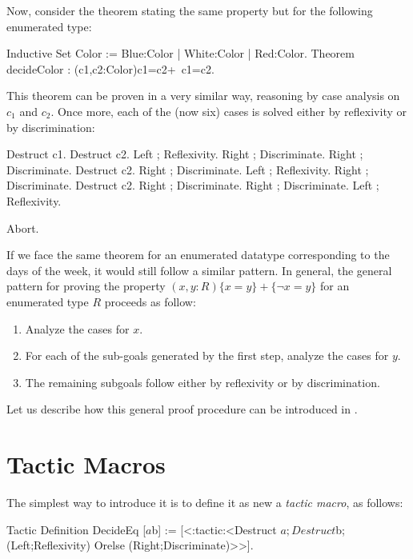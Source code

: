 Now, consider the theorem stating the same property but for the
following enumerated type:

\begin{coq_example*}
Inductive Set Color := Blue:Color | White:Color | Red:Color.
Theorem decideColor : (c1,c2:Color){c1=c2}+{~c1=c2}.
\end{coq_example*}

This theorem can be proven in a very similar way, reasoning by case
analysis on $c_1$ and $c_2$. Once more, each of the (now six) cases is
solved either by reflexivity or by discrimination:

\begin{coq_example*}
Destruct c1. 
  Destruct c2.
    Left  ; Reflexivity.
    Right ; Discriminate.
    Right ; Discriminate.
  Destruct c2.  
    Right ; Discriminate.
    Left  ; Reflexivity.
    Right ; Discriminate.
  Destruct c2.  
    Right ; Discriminate.
    Right ; Discriminate.
    Left  ; Reflexivity.
\end{coq_example*}
\begin{coq_eval}
Abort.
\end{coq_eval}

If we face the same theorem for an enumerated datatype corresponding
to the days of the week, it would still follow a similar pattern. In
general, the general pattern for proving the property
$(x,y:R)\{x=y\}+\{\neg x =y\}$ for an enumerated type $R$ proceeds as
follow:
\begin{enumerate}
\item Analyze the cases for $x$. 
\item For each of the sub-goals generated by the first step, analyze
the cases for $y$.
\item The remaining subgoals follow either by reflexivity or
by discrimination.
\end{enumerate}

Let us describe how this general proof procedure can be introduced in
\Coq.

\section{Tactic Macros}

The simplest way to introduce it is to define it as new a
\textsl{tactic macro}, as follows:

\begin{coq_example*}
Tactic Definition DecideEq [$a $b] := 
   [<:tactic:<Destruct $a;
              Destruct $b;
              (Left;Reflexivity) Orelse (Right;Discriminate)>>].
\end{coq_example*}

